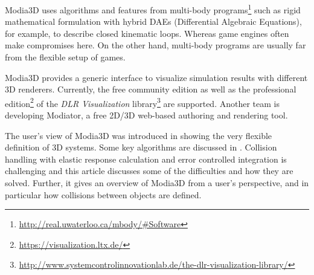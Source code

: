 Modia3D uses algorithms and features from multi-body
programs\footnote{\href{http://real.uwaterloo.ca/~mbody/\#Software}{http://real.uwaterloo.ca/mbody/\#Software}}
such as rigid mathematical formulation with hybrid DAEs (Differential Algebraic Equations), for example, to
describe closed kinematic loops. Whereas game engines often make compromises here. On the other hand,
multi-body programs are usually far from the flexible setup of games.

Modia3D provides a generic interface to visualize simulation results with different 3D renderers. Currently, the free community edition as well as the professional edition\footnote{\href{https://visualization.ltx.de/}{https://visualization.ltx.de/}} of the
\emph{DLR Visualization}  library\footnote{\href{http://www.systemcontrolinnovationlab.de/the-dlr-visualization-library/}{http://www.systemcontrolinnovationlab.de/the-dlr-visualization-library/}} \cite{bellmann2009, hellerer2014} are supported. Another team is developing Modiator, a free 2D/3D web-based authoring and rendering tool.

The user's view of Modia3D was introduced in \cite{Neumayr2018} showing the very flexible definition of 3D systems.
Some key algorithms are discussed in \cite{Neumayr2017,Neumayr2019}. Collision handling with elastic response calculation and error controlled integration
is challenging and this article discusses some of the difficulties and how they are solved. Further, it gives an overview of Modia3D from a user's perspective, and in particular how collisions between objects are defined.

\begin{table}[t]
	\label{table:ModiaPlatform} 
\end{table}

